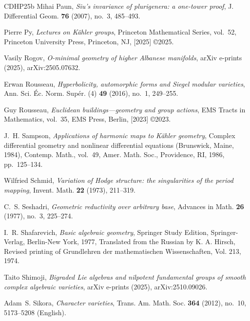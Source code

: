 \documentclass[english]{amsproc}
\theoremstyle{plain}
\theoremstyle{definition}
\theoremstyle{remark}
\theoremstyle{plain}
\numberwithin{equation}{thm} %
\begin{document}
\begin{thebibliography}{CDHP25b}
		Mihai Paun, \emph{Siu's invariance of plurigenera: a one-tower proof}, J.
		Differential Geom. \textbf{76} (2007), no.~3, 485--493. 
		
		Pierre Py, \emph{Lectures on {K}\"ahler groups}, Princeton Mathematical Series,
		vol.~52, Princeton University Press, Princeton, NJ, [2025] \copyright 2025.
		
		Vasily {Rogov}, \emph{{O-minimal geometry of higher Albanese manifolds}}, arXiv
		e-prints (2025), arXiv:2505.07632.
		
		Erwan Rousseau, \emph{Hyperbolicity, automorphic forms and {S}iegel modular
			varieties}, Ann. Sci. \'Ec. Norm. Sup\'er. (4) \textbf{49} (2016), no.~1,
		249--255. 
		
		Guy Rousseau, \emph{Euclidean buildings---geometry and group actions}, EMS
		Tracts in Mathematics, vol.~35, EMS Press, Berlin, [2023] \copyright 2023.
		
		J.~H. Sampson, \emph{Applications of harmonic maps to {K}\"ahler geometry},
		Complex differential geometry and nonlinear differential equations
		({B}runswick, {M}aine, 1984), Contemp. Math., vol.~49, Amer. Math. Soc.,
		Providence, RI, 1986, pp.~125--134. 
		
		Wilfried Schmid, \emph{Variation of {H}odge structure: the singularities of the
			period mapping}, Invent. Math. \textbf{22} (1973), 211--319. 
		
		C.~S. Seshadri, \emph{Geometric reductivity over arbitrary base}, Advances in
		Math. \textbf{26} (1977), no.~3, 225--274. 
		
		I.~R. Shafarevich, \emph{Basic algebraic geometry}, Springer Study Edition,
		Springer-Verlag, Berlin-New York, 1977, Translated from the Russian by K. A.
		Hirsch, Revised printing of Grundlehren der mathematischen Wissenschaften,
		Vol. 213, 1974. 
		
		Taito {Shimoji}, \emph{{Bigraded Lie algebras and nilpotent fundamental groups
				of smooth complex algebraic varieties}}, arXiv e-prints (2025),
		arXiv:2510.09026.
		
		Adam~S. Sikora, \emph{Character varieties}, Trans. Am. Math. Soc. \textbf{364}
		(2012), no.~10, 5173--5208 (English).
		

\end{thebibliography}
\end{document}
